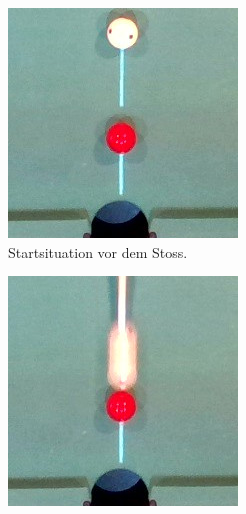 \begin{figure}[h!]
    \centering
    \begin{subfigure}[t]{0.2\textwidth}
        \centering
        \includegraphics[width=1.0\linewidth]{../common/04_results/resources/simulation_vs_reality/simulation_vs_reality_1_0008_0011_situation_cut.jpg}
        \caption{Startsituation vor dem Stoss.}
        \label{fig:simulation_vs_reality_1_0008_0011_situation}
    \end{subfigure}
    \hfill
    \begin{subfigure}[t]{0.2\textwidth}
        \centering
        \includegraphics[width=1.0\linewidth]{../common/04_results/resources/simulation_vs_reality/simulation_vs_reality_1_0008_0011_collision_cut.jpg}

\end{subfigure}
\end{figure}

